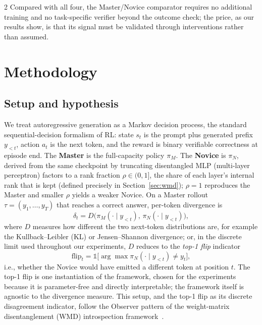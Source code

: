 \documentclass[9pt]{article}
\begin{document}
\begin{multicols}{2}
Compared with all four, the Master/Novice comparator requires no additional
training and no task-specific verifier beyond the outcome check; the price, as
our results show, is that its signal must be validated through interventions
rather than assumed.

\section{Methodology}

\subsection{Setup and hypothesis}\label{sec:hypothesis}

We treat autoregressive generation as a Markov decision process, the standard
sequential-decision formalism of RL: state $s_t$ is
the prompt plus generated prefix $y_{<t}$, action $a_t$ is the next token, and
the reward is binary verifiable correctness at episode end. The
\textbf{Master} is the full-capacity policy $\pi_M$. The \textbf{Novice} is
$\pi_N$, derived from the same checkpoint by truncating disentangled MLP
(multi-layer perceptron) factors to a rank fraction $\rho \in (0,1]$, the share of each layer's internal
rank that is kept (defined precisely in Section~\ref{sec:wmd}); $\rho{=}1$
reproduces the Master and smaller $\rho$ yields a weaker Novice. On a Master
rollout
$\tau = (y_1,\ldots,y_T)$ that reaches a correct answer, per-token divergence
is
\begin{equation}
\delta_t = D\bigl(\pi_M(\cdot \mid y_{<t}),\, \pi_N(\cdot \mid y_{<t})\bigr),
\end{equation}
where $D$ measures how different the two next-token distributions are, for
example the Kullback--Leibler (KL) or Jensen--Shannon divergence; or, in the
discrete limit used throughout our experiments, $D$ reduces to the
\emph{top-1 flip} indicator
\begin{equation}
\mathrm{flip}_t = \mathbb{1}\bigl[\arg\max \pi_N(\cdot \mid y_{<t}) \neq y_t\bigr],
\end{equation}
i.e., whether the Novice would have emitted a different token at position $t$.
The top-1 flip is one instantiation of the framework, chosen for the
experiments because it is parameter-free and directly interpretable; the
framework itself is agnostic to the divergence measure. This setup, and the
top-1 flip as its discrete disagreement indicator, follow the Observer
pattern of the weight-matrix disentanglement (WMD) introspection
framework~\citep{till2026introspection}.


\end{multicols}
\end{document}
